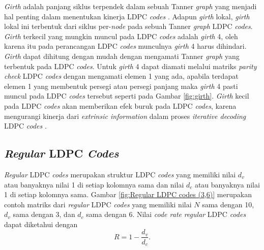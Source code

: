 	 \textit{Girth} adalah panjang siklus terpendek dalam sebuah Tanner \textit{graph} yang menjadi hal penting dalam menentukan kinerja LDPC \textit{codes} \cite{girth}. Adapun \textit{girth} lokal, \textit{girth} lokal ini terbentuk dari siklus per-\textit{node} pada sebuah Tanner \textit{graph} LDPC \textit{codes}. \textit{Girth} terkecil yang mungkin muncul pada LDPC \textit{codes} adalah \textit{girth} 4, oleh karena itu pada perancangan LDPC \textit{codes} munculnya \textit{girth} 4 harus dihindari. \textit{Girth} dapat dihitung dengan mudah dengan mengamati Tanner \textit{graph} yang terbentuk pada LDPC \textit{codes}. Untuk \textit{girth} 4 dapat diamati melalui matriks \textit{parity check} LDPC \textit{codes} dengan mengamati elemen 1 yang ada, apabila terdapat elemen 1 yang membentuk persegi atau persegi panjang maka \textit{girth} 4 pasti muncul pada LDPC \textit{codes} tersebut seperti pada Gambar \ref{fig:girth}. \textit{Girth} kecil pada LDPC \textit{codes} akan memberikan efek buruk pada LDPC \textit{codes}, karena mengurangi kinerja dari \textit{extrinsic information} dalam proses \textit{iterative decoding} LDPC \textit{codes} \cite{girth2}.

\subsection{\textit{Regular} LDPC \textit{Codes}}
\textit{Regular} LDPC \textit{codes} merupakan struktur LDPC \textit{codes} yang memiliki nilai $d_{v}$ atau banyaknya nilai 1 di setiap kolomnya sama dan nilai $d_{c}$ atau banyaknya nilai 1 di setiap kolomnya sama. Gambar \ref{fig:Regular LDPC codes (3,6)} merupakan contoh matriks dari \textit{regular} LDPC \textit{codes} yang memiliki nilai $N$ sama dengan 10, $d_{v}$ sama dengan 3, dan $d_{c}$ sama dengan 6. Nilai \textit{code rate} \textit{regular} LDPC \textit{codes} dapat diketahui dengan
\begin{equation}
R=1-\frac{d_{v}}{d_{c}}.
\label{code rate regular LDPC codes}
\end{equation}
